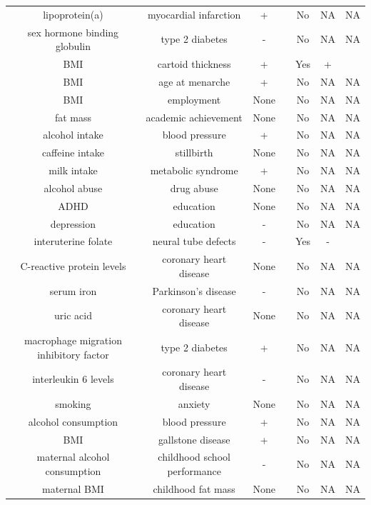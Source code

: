 \documentclass[11pt,titlepage]{article}
\begin{document}
\begin{table}[htdp]
\begin{center}
\begin{footnotesize}
\begin{tabular}{|c|c|c|c|c|c|c|}
lipoprotein(a)& myocardial infarction & + & \cite{Kamstrup:2009aa} & No & NA & NA\\
sex hormone binding globulin & type 2 diabetes & - & \cite{Ding:2009aa} & No & NA & NA\\
BMI & cartoid thickness & + & \cite{Kivimaki:2008ab} &Yes& + & \citep{Shai:2010aa, Hjerkinn:2006aa} \\
BMI & age at menarche & + & \cite{Mumby:2011aa} &No & NA &NA \\
BMI & employment & None & \cite{norton2008genetic} &No & NA & NA\\
fat mass & academic achievement & None & \cite{von2010genetic} &No &NA& NA\\
alcohol intake & blood pressure &  +& \cite{Chen:2008aa}&No & NA & NA\\
caffeine intake & stillbirth & None & \cite{Bech:2006aa}& No & NA & NA\\
milk intake & metabolic syndrome & +  & \cite{almon2010associations} &No & NA & NA\\
alcohol abuse & drug abuse & None & \cite{Irons:2007aa}&No & NA & NA\\
ADHD & education & None& \cite{ding2009impact}&No & NA & NA\\
depression & education & - & \cite{ding2009impact}&No & NA & NA\\
interuterine folate & neural tube defects & -& \cite{Smith:2003ab} & Yes & - & \cite{mrc1991prevention}\\
C-reactive protein levels & coronary heart disease & None & \cite{C-Reactive-Protein-Coronary-Heart-Disease-Genetics-Collaboration-CCGC:2011aa} & No & NA & NA \\
serum iron & Parkinson's disease & - & \cite{Pichler:2013aa} & No & NA & NA \\
uric acid & coronary heart disease & None & \cite{Palmer:2013aa} & No & NA & NA \\
macrophage migration inhibitory factor & type 2 diabetes & + & \cite{Herder:2008aa} & No & NA & NA \\
interleukin 6 levels & coronary heart disease & -  & \cite{IL6R-Genetics-Consortium-Emerging-Risk-Factors-Collaboration:2012aa}& No & NA & NA \\
smoking & anxiety & None & \cite{Lewis:2011aa} & No & NA &NA  \\
alcohol consumption &  blood pressure & + & \cite{Chen:2008aa} & No  & NA & NA \\
BMI & gallstone disease & + & \cite{stender2013elevated} & No & NA & NA \\
maternal alcohol consumption & childhood school performance  & - & \cite{Zuccolo:2013aa}& No & NA & NA \\
maternal BMI & childhood fat mass & None & \cite{Lawlor:2008aa} & No & NA & NA \\
\hline
\end{tabular}
\end{footnotesize}
\end{center}
\label{default}
\end{table}%
\end{document}
